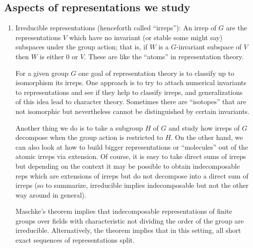\documentclass[11pt,leqno]{article}
\theoremstyle{plain}
\theoremstyle{definition}
\numberwithin{equation}{section}
\numberwithin{lem}{section}
\begin{document}
\subsection{Aspects of representations we study}
\begin{enumerate}
    \item Irreducible representations (henceforth called ``irreps''): An irrep of $G$ are the representations $V$ which have no invariant (or stable some might say) subspaces under the group action; that is, if $W$ is a $G$-invariant subspace of $V$ then $W$ is either $0$ or $V$. These are like the ``atoms'' in representation theory.
    
    For a given group $G$ one goal of representation theory is to classify up to isomorphism its irreps. One approach is to try to attach numerical invariants to representations and see if they help to classify irreps, and generalizations of this idea lead to character theory. Sometimes there are ``isotopes'' that are not isomorphic but nevertheless cannot be distinguished by certain invariants.

    Another thing we do is to take a subgroup $H$ of $G$ and study how irreps of $G$ decompose when the group action is restricted to $H$. On the other hand, we can also look at how to build bigger representations or ``molecules'' out of the atomic irreps via extension. Of course, it is easy to take direct sums of irreps but depending on the context it may be possible to obtain indecomposable reps which are extensions of irreps but do not decompose into a direct sum of irreps (so to summarize, irreducible implies indecomposable but not the other way around in general).

    Maschke's theorem implies that indecomposable representations of finite groups over fields with characteristic not dividing the order of the group are irreducible. Alternatively, the theorem implies that in this setting, all short exact sequences of representations split.
    

\end{enumerate}
\end{document}
